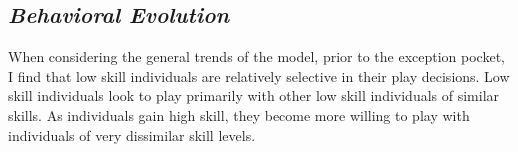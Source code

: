 \documentclass[12pt,letterpaper]{article}
\begin{document}
      
      
 
  
        
  \subsection{\it Behavioral Evolution}
      When considering the general trends of the model, prior to the exception pocket, I find that low skill individuals are relatively selective in their play decisions. 
      Low skill individuals look to play primarily with other low skill individuals of similar skills.
      As individuals gain high skill, they become more willing to play with individuals of very dissimilar skill levels. 
      
\end{document}
